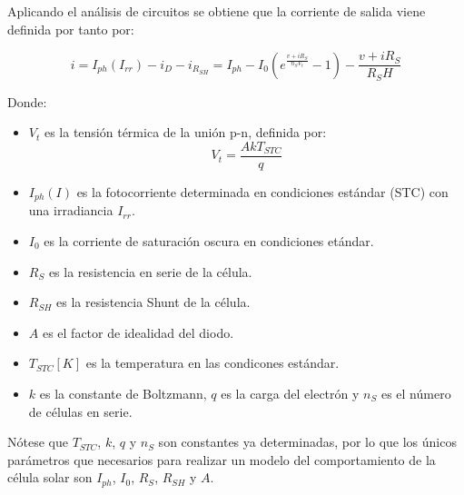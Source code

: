 Aplicando el análisis de circuitos se obtiene que la corriente de salida viene definida por tanto por:

\begin{equation}
i = I_{ph}(I_{rr}) - i_D - i_{R_{SH}} =I_{ph} -I_0(e^{\frac{v+i R_S}{n_S V_t}} - 1)- \frac{v+iR_S}{R_SH}
\label{eq:ModeloDiodoUnico}
\end{equation}

Donde: 
\begin{itemize}
    \item $V_t$ es la tensión térmica de la unión p-n, definida por:
    \begin{equation}
    V_t=\frac{AkT_{STC}}{q}
    \label{eq:TensionTermica}
    \end{equation}
    \item $I_{ph}(I)$ es la fotocorriente determinada en condiciones estándar (STC) con una irradiancia $I_{rr}$.
    \item $I_0$ es la corriente de saturación oscura en condiciones etándar.
    \item $R_S$ es la resistencia en serie de la célula.
    \item $R_{SH}$ es la resistencia Shunt de la célula.
    \item $A$ es el factor de idealidad del diodo.
    \item $T_{STC}[K]$ es la temperatura en las condicones estándar.
    \item $k$ es la constante de Boltzmann, $q$ es la carga del electrón y $n_S$ es el número de células en serie.
\end{itemize}

Nótese que $T_{STC}$, $k$, $q$ y $n_S$ son constantes ya determinadas, por lo que
los únicos parámetros que necesarios para realizar un modelo del comportamiento de la célula solar son $I_{ph}$, $I_0$,
$R_S$,  $R_{SH}$ y $A$.